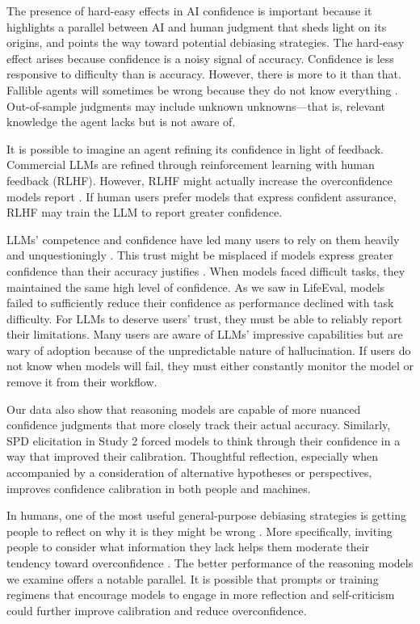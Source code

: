 \documentclass{article}
\begin{document}
The presence of hard-easy effects in AI confidence is important because it highlights a parallel between AI and human judgment that sheds light on its origins, and points the way toward potential debiasing strategies. The hard-easy effect arises because confidence is a noisy signal of accuracy. Confidence is less responsive to difficulty than is accuracy. However, there is more to it than that. Fallible agents will sometimes be wrong because they do not know everything \citep{Moore_2023}. Out-of-sample judgments may include unknown unknowns---that is, relevant knowledge the agent lacks but is not aware of.

It is possible to imagine an agent refining its confidence in light of feedback. Commercial LLMs are refined through reinforcement learning with human feedback (RLHF). However, RLHF might actually increase the overconfidence models report \citep{Tian2023Calibration}. If human users prefer models that express confident assurance, RLHF may train the LLM to report greater confidence. 

LLMs' competence and confidence have led many users to rely on them heavily and unquestioningly \citep{Hou_2025}. This trust might be misplaced if models express greater confidence than their accuracy justifies \citep{Steyvers2025}. When models faced difficult tasks, they maintained the same high level of confidence. As we saw in LifeEval, models failed to sufficiently reduce their confidence as performance declined with task difficulty. For LLMs to deserve users' trust, they must be able to reliably report their limitations. Many users are aware of LLMs' impressive capabilities but are wary of adoption because of the unpredictable nature of hallucination. If users do not know when models will fail, they must either constantly monitor the model or remove it from their workflow.

Our data also show that reasoning models are capable of more nuanced confidence judgments that more closely track their actual accuracy. Similarly, SPD elicitation in Study 2 forced models to think through their confidence in a way that improved their calibration. Thoughtful reflection, especially when accompanied by a consideration of alternative hypotheses or perspectives, improves confidence calibration in both people and machines. 

In humans, one of the most useful general-purpose debiasing strategies is getting people to reflect on why it is they might be wrong \citep{Lord_1984}. More specifically, inviting people to consider what information they lack helps them moderate their tendency toward overconfidence \citep{Walters_2017}. The better performance of the reasoning models we examine offers a notable parallel. It is possible that prompts or training regimens that encourage models to engage in more reflection and self-criticism could further improve calibration and reduce overconfidence. 
\end{document}
